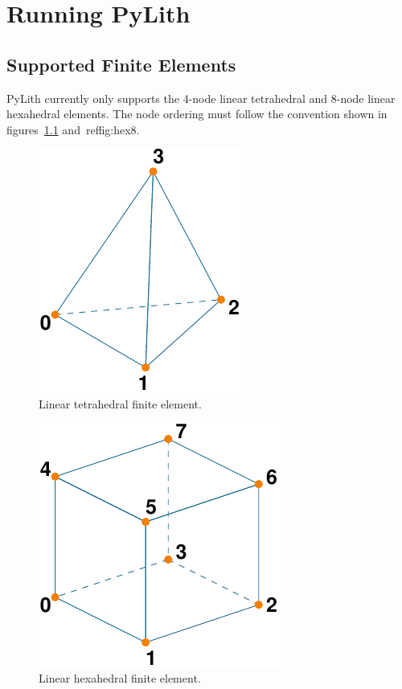 \chapter{Running PyLith}

\section{Supported Finite Elements}

PyLith currently only supports the 4-node linear tetrahedral and
8-node linear hexahedral elements. The node ordering must follow the
convention shown in figures~\ref{fig:tet4} and~ref{fig:hex8}.

\begin{figure}[htbp]
  \begin{center}
    \includegraphics{figs/tet4}
    \caption{Linear tetrahedral finite element.}
    \label{fig:tet4}
  \end{center}
\end{figure}

\begin{figure}[htbp]
  \begin{center}
    \includegraphics{figs/hex8}
    \caption{Linear hexahedral finite element.}
    \label{fig:hex8}
  \end{center}
\end{figure}

